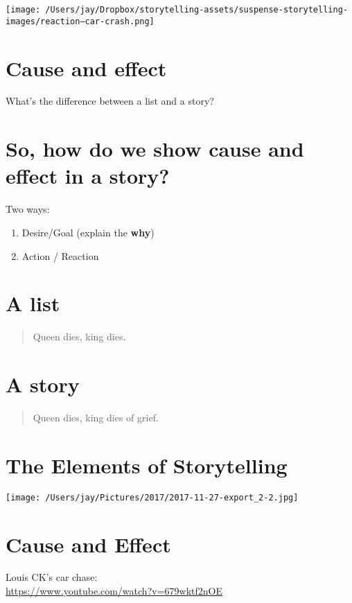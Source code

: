 \documentclass[12pt]{article}
\begin{document}
\begin{center}
\texttt{[image: /Users/jay/Dropbox/storytelling-assets/suspense-storytelling-images/reaction--car-crash.png]}
\end{center}

\section{Cause and effect}
\label{sec:orgd7880e4}
What's the difference between a list and a story?

\section{So, \textbf{how} do we \textbf{show} cause and effect in a story?}
\label{sec:org68907f6}
Two ways:

\begin{enumerate}
\item Desire/Goal (explain the \textbf{why})
\item Action / Reaction
\end{enumerate}


\section{A list}
\label{sec:org80da360}

\begin{quote}
Queen dies, king dies.
\end{quote}

\section{A story}
\label{sec:orgf737ebb}

\begin{quote}
Queen dies, king dies of grief.
\end{quote}



\section{The Elements of Storytelling}
\label{sec:orgfed786b}
\begin{center}
\texttt{[image: /Users/jay/Pictures/2017/2017-11-27-export\_2-2.jpg]}
\end{center}

\section{Cause and Effect}
\label{sec:org86c3a97}
Louis CK's car chase: \\
\url{https://www.youtube.com/watch?v=679wktf2nOE}
\end{document}
